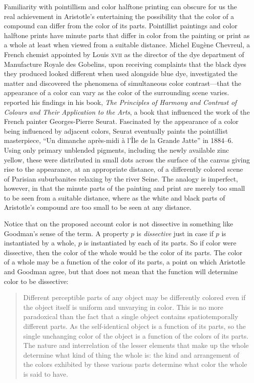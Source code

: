 Familiarity with pointillism and color halftone printing can obscure for us the real achievement in Aristotle's entertaining the possibility that the color of a compound can differ from the color of its parts. Pointillist paintings and color halftone prints have minute parts that differ in color from the painting or print as a whole at least when viewed from a suitable distance. Michel Eugène Chevreul, a French chemist appointed by Louis \textsc{xvii} as the director of the dye department of Manufacture Royale des Gobelins, upon receiving complaints that the black dyes they produced looked different when used alongside blue dye, investigated the matter and discovered the phenomena of simultaneous color contrast---that the appearance of a color can vary as the color of the surrounding scene varies. \citet{Chevreul:1855kx} reported his findings in his book, \emph{The Principles of Harmony and Contrast of Colours and Their Application to the Arts}, a book that influenced the work of the French painter Georges-Pierre Seurat. Fascinated by the appearance of a color being influenced by adjacent colors, Seurat eventually paints the pointillist masterpiece, “Un dimanche après-midi à l'Île de la Grande Jatte” in 1884--6. Using only primary unblended pigments, including the newly available zinc yellow, these were distributed in small dots across the surface of the canvas giving rise to the appearance, at an appropriate distance, of a differently colored scene of Parisian suburbanites relaxing by the river Seine. The analogy is imperfect, however, in that the minute parts of the painting and print are merely too small to be seen from a suitable distance, where as the white and black parts of Aristotle's compound are too small to be seen at any distance.

Notice that on the proposed account color is not dissective in something like Goodman's \citeyearpar[53]{Goodman:1951ww} sense of the term. A property \( p \) is \emph{dissective} just in case if \( p \) is instantiated by a whole, \( p \) is instantiated by each of its parts. So if color were dissective, then the color of the whole would be the color of its parts. The color of a whole may be a function of the color of its parts, a point on which Aristotle and Goodman agree, but that does not mean that the function will determine color to be dissective:
\begin{quote}
	Different perceptible parts of any object may be differently colored even if the object itself is uniform and unvarying in color. This is no more paradoxical than the fact that a single object contains spatiotemporally different parts. As the self-identical object is a function of its parts, so the single unchanging color of the object is a function of the colors of its parts. The nature and interrelation of the lesser elements that make up the whole determine what kind of thing the whole is: the kind and arrangement of the colors exhibited by these various parts determine what color the whole is said to have. \citep[130]{Goodman:1951ww}
\end{quote}

